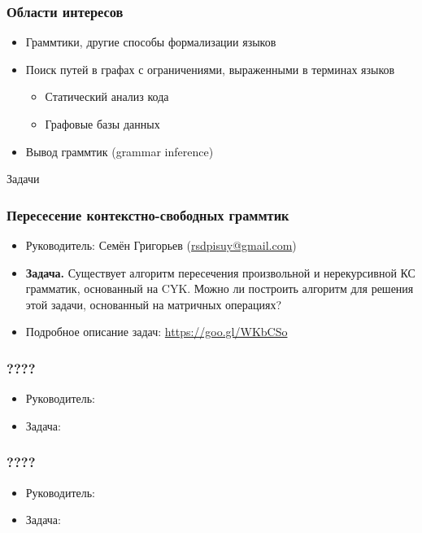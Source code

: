 \documentclass{beamer}
\begin{document}
\begin{frame}[fragile]
  \transwipe[direction=90]
  \frametitle{Области интересов}
  \begin{itemize}
    \item Граммтики, другие способы формализации языков
    \item Поиск путей в графах с ограничениями, выраженными в терминах языков
    \begin{itemize}
      \item Статический анализ кода
      \item Графовые базы данных
    \end{itemize}
    \item Вывод граммтик (grammar inference)
  \end{itemize}
\end{frame}

\begin{frame}[plain,c]
 \transwipe[direction=90]
 \begin{center}
  \Huge Задачи
 \end{center}
\end{frame}

\begin{frame}
  \transwipe[direction=90]
  \frametitle{Пересесение контекстно-свободных граммтик}
  \begin{itemize}
    \item Руководитель: Семён Григорьев (\url{rsdpisuy@gmail.com})
    \item \textbf{Задача.} Существует алгоритм пересечения произвольной и нерекурсивной КС грамматик, основанный на CYK. Можно ли построить алгоритм для решения этой задачи, основанный на матричных операциях?
    \item Подробное описание задач: \url{https://goo.gl/WKbCSo}
  \end{itemize}
\end{frame}

\begin{frame}
  \transwipe[direction=90]
  \frametitle{????}
  \begin{itemize}
    \item Руководитель:
    \item Задача:
  \end{itemize}
\end{frame}

\begin{frame}
  \transwipe[direction=90]
  \frametitle{????}
  \begin{itemize}
    \item Руководитель:
    \item Задача:
  \end{itemize}
\end{frame}
\end{document}
